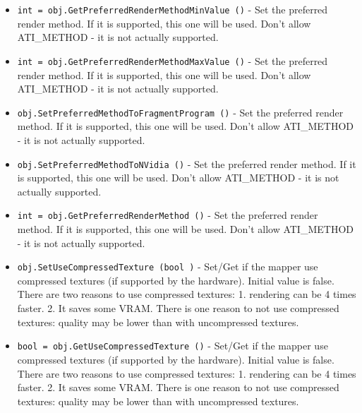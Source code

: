\begin{itemize}
\item  \verb|int = obj.GetPreferredRenderMethodMinValue ()| -  Set the preferred render method. If it is supported, this
 one will be used. Don't allow ATI\_METHOD - it is not actually
 supported.

\item  \verb|int = obj.GetPreferredRenderMethodMaxValue ()| -  Set the preferred render method. If it is supported, this
 one will be used. Don't allow ATI\_METHOD - it is not actually
 supported.

\item  \verb|obj.SetPreferredMethodToFragmentProgram ()| -  Set the preferred render method. If it is supported, this
 one will be used. Don't allow ATI\_METHOD - it is not actually
 supported.

\item  \verb|obj.SetPreferredMethodToNVidia ()| -  Set the preferred render method. If it is supported, this
 one will be used. Don't allow ATI\_METHOD - it is not actually
 supported.

\item  \verb|int = obj.GetPreferredRenderMethod ()| -  Set the preferred render method. If it is supported, this
 one will be used. Don't allow ATI\_METHOD - it is not actually
 supported.

\item  \verb|obj.SetUseCompressedTexture (bool )| -  Set/Get if the mapper use compressed textures (if supported by the
 hardware). Initial value is false.
 There are two reasons to use compressed textures: 1. rendering can be 4
 times faster. 2. It saves some VRAM.
 There is one reason to not use compressed textures: quality may be lower
 than with uncompressed textures.

\item  \verb|bool = obj.GetUseCompressedTexture ()| -  Set/Get if the mapper use compressed textures (if supported by the
 hardware). Initial value is false.
 There are two reasons to use compressed textures: 1. rendering can be 4
 times faster. 2. It saves some VRAM.
 There is one reason to not use compressed textures: quality may be lower
 than with uncompressed textures.

\end{itemize}
